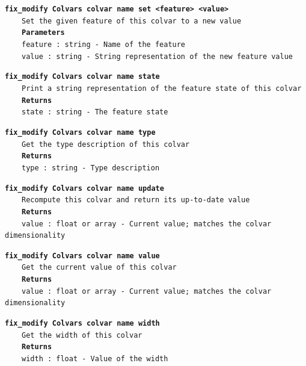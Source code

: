 \begin{mdexampleinput}{}
\texttt{\textbf{fix\_modify Colvars colvar name set <feature> <value>}}
\\
\-~~~~\texttt{Set the given feature of this colvar to a new value}
\\
\-~~~~\texttt{\textbf{Parameters}}
\\
\-~~~~\texttt{feature : string - Name of the feature}
\\
\-~~~~\texttt{value : string - String representation of the new feature value}
\end{mdexampleinput}
\begin{mdexampleinput}{}
\texttt{\textbf{fix\_modify Colvars colvar name state}}
\\
\-~~~~\texttt{Print a string representation of the feature state of this colvar}
\\
\-~~~~\texttt{\textbf{Returns}}
\\
\-~~~~\texttt{state : string - The feature state}
\end{mdexampleinput}
\begin{mdexampleinput}{}
\texttt{\textbf{fix\_modify Colvars colvar name type}}
\\
\-~~~~\texttt{Get the type description of this colvar}
\\
\-~~~~\texttt{\textbf{Returns}}
\\
\-~~~~\texttt{type : string - Type description}
\end{mdexampleinput}
\begin{mdexampleinput}{}
\texttt{\textbf{fix\_modify Colvars colvar name update}}
\\
\-~~~~\texttt{Recompute this colvar and return its up-to-date value}
\\
\-~~~~\texttt{\textbf{Returns}}
\\
\-~~~~\texttt{value : float or array - Current value; matches the colvar dimensionality}
\end{mdexampleinput}
\begin{mdexampleinput}{}
\texttt{\textbf{fix\_modify Colvars colvar name value}}
\\
\-~~~~\texttt{Get the current value of this colvar}
\\
\-~~~~\texttt{\textbf{Returns}}
\\
\-~~~~\texttt{value : float or array - Current value; matches the colvar dimensionality}
\end{mdexampleinput}
\begin{mdexampleinput}{}
\texttt{\textbf{fix\_modify Colvars colvar name width}}
\\
\-~~~~\texttt{Get the width of this colvar}
\\
\-~~~~\texttt{\textbf{Returns}}
\\
\-~~~~\texttt{width : float - Value of the width}
\end{mdexampleinput}
